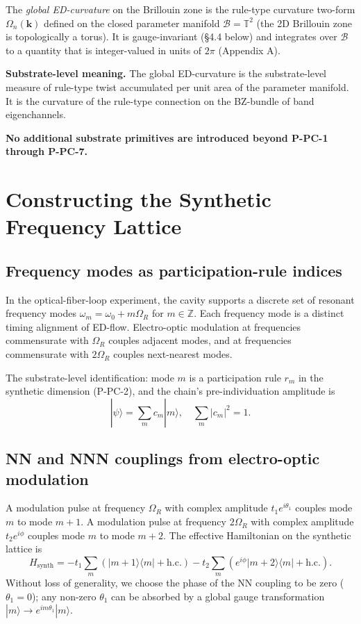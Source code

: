 \documentclass[11pt,a4paper]{article}
\begin{document}
The \emph{global ED-curvature} on the Brillouin zone is the rule-type curvature two-form $\Omega_n(\mathbf{k})$ defined on the closed parameter manifold $\mathcal{B} = \mathbb{T}^2$ (the 2D Brillouin zone is topologically a torus). It is gauge-invariant (\S4.4 below) and integrates over $\mathcal{B}$ to a quantity that is integer-valued in units of $2\pi$ (Appendix A).

\textbf{Substrate-level meaning.} The global ED-curvature is the substrate-level measure of rule-type twist accumulated per unit area of the parameter manifold. It is the curvature of the rule-type connection on the BZ-bundle of band eigenchannels.

\textbf{No additional substrate primitives are introduced beyond P-PC-1 through P-PC-7.}

\section{Constructing the Synthetic Frequency Lattice}

\subsection{Frequency modes as participation-rule indices}

In the optical-fiber-loop experiment, the cavity supports a discrete set of resonant frequency modes $\omega_m = \omega_0 + m\Omega_R$ for $m \in \mathbb{Z}$. Each frequency mode is a distinct timing alignment of ED-flow. Electro-optic modulation at frequencies commensurate with $\Omega_R$ couples adjacent modes, and at frequencies commensurate with $2\Omega_R$ couples next-nearest modes.

The substrate-level identification: mode $m$ is a participation rule $r_m$ in the synthetic dimension (P-PC-2), and the chain's pre-individuation amplitude is
\[
|\psi\rangle = \sum_m c_m|m\rangle, \quad \sum_m|c_m|^2 = 1.
\]

\subsection{NN and NNN couplings from electro-optic modulation}

A modulation pulse at frequency $\Omega_R$ with complex amplitude $t_1 e^{i\theta_1}$ couples mode $m$ to mode $m+1$. A modulation pulse at frequency $2\Omega_R$ with complex amplitude $t_2 e^{i\phi}$ couples mode $m$ to mode $m+2$. The effective Hamiltonian on the synthetic lattice is
\[
H_{\mathrm{synth}} = -t_1\sum_m(|m+1\rangle\langle m| + \mathrm{h.c.}) - t_2\sum_m(e^{i\phi}|m+2\rangle\langle m| + \mathrm{h.c.}).
\]
Without loss of generality, we choose the phase of the NN coupling to be zero ($\theta_1 = 0$); any non-zero $\theta_1$ can be absorbed by a global gauge transformation $|m\rangle \to e^{im\theta_1}|m\rangle$.
\end{document}
